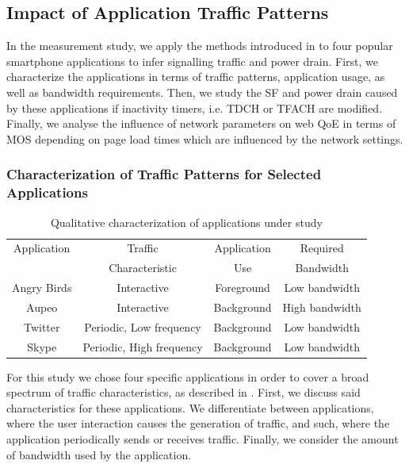 \subsection{Impact of Application Traffic Patterns}\label{sec:network:network_traces:numerical_results}
In the measurement study, we apply the methods introduced in  to four popular smartphone
applications to infer signalling traffic and power drain.
First, we characterize the applications in terms of traffic patterns, application usage, as well as bandwidth requirements.
Then, we study the \gls{SF} and power drain caused by these applications if inactivity timers, i.e. \gls{TDCH} or \gls{TFACH} are modified.
Finally, we analyse the influence of network parameters on web \gls{QoE} in terms of \gls{MOS} depending on page load times which are influenced by the network settings.

\subsubsection*{Characterization of Traffic Patterns for Selected Applications}\label{sec:network:network_traces:numerical_results:traffic_characterization}

\begin{table}
  \centering
  \caption{Qualitative characterization of applications under study}
  \label{tab:network:network_traces:numerical_results:app_characterization}
  \begin{tabular}{cccc}
  	\bottomrule
    Application&Traffic&Application&Required\\
    &Characteristic&Use&Bandwidth\\
    \midrule
    Angry Birds & Interactive & Foreground & Low bandwidth \\
    Aupeo & Interactive & Background & High bandwidth\\
    Twitter & Periodic, Low frequency & Background & Low bandwidth\\
    Skype & Periodic, High frequency& Background & Low bandwidth\\
    \bottomrule
  \end{tabular}
\end{table}

For this study we chose four specific applications in order to cover a broad spectrum of traffic characteristics, as described in .
First, we discuss said characteristics for these applications.
We differentiate between applications, where the user interaction causes the generation of traffic, and such, where the application periodically sends or receives traffic.
Finally, we consider the amount of bandwidth used by the application.

